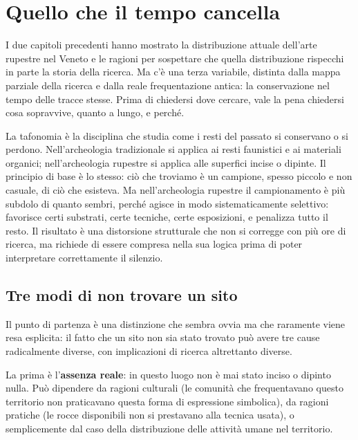 \chapter{Quello che il tempo cancella}
\label{cap:tafonomia}

I due capitoli precedenti hanno mostrato la distribuzione attuale dell'arte rupestre nel Veneto e le ragioni per sospettare che quella distribuzione rispecchi in parte la storia della ricerca. Ma c'è una terza variabile, distinta dalla mappa parziale della ricerca e dalla reale frequentazione antica: la conservazione nel tempo delle tracce stesse. Prima di chiedersi dove cercare, vale la pena chiedersi cosa sopravvive, quanto a lungo, e perché.

La tafonomia è la disciplina che studia come i resti del passato si conservano o si perdono. Nell'archeologia tradizionale si applica ai resti faunistici e ai materiali organici; nell'archeologia rupestre si applica alle superfici incise o dipinte. Il principio di base è lo stesso: ciò che troviamo è un campione, spesso piccolo e non casuale, di ciò che esisteva. Ma nell'archeologia rupestre il campionamento è più subdolo di quanto sembri, perché agisce in modo sistematicamente selettivo: favorisce certi substrati, certe tecniche, certe esposizioni, e penalizza tutto il resto. Il risultato è una distorsione strutturale che non si corregge con più ore di ricerca, ma richiede di essere compresa nella sua logica prima di poter interpretare correttamente il silenzio.

\section{Tre modi di non trovare un sito}

Il punto di partenza è una distinzione che sembra ovvia ma che raramente viene resa esplicita: il fatto che un sito non sia stato trovato può avere tre cause radicalmente diverse, con implicazioni di ricerca altrettanto diverse.

La prima è l'\textbf{assenza reale}: in questo luogo non è mai stato inciso o dipinto nulla. Può dipendere da ragioni culturali (le comunità che frequentavano questo territorio non praticavano questa forma di espressione simbolica), da ragioni pratiche (le rocce disponibili non si prestavano alla tecnica usata), o semplicemente dal caso della distribuzione delle attività umane nel territorio.

